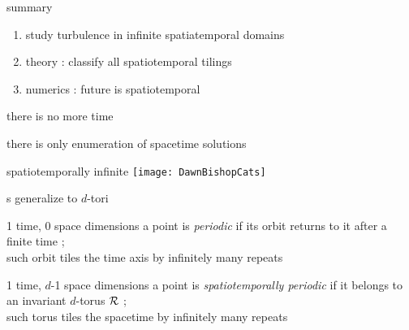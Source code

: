 \begin{frame}{summary}
\begin{enumerate}
              \item
study turbulence in infinite spatiatemporal domains
              \item
theory : classify all spatiotemporal tilings
              \item
numerics : future is spatiotemporal
\end{enumerate}

\vfill

there is no more time

\medskip

there is only enumeration of spacetime solutions
\end{frame}

\begin{frame}{spatiotemporally infinite \catlatt}
\hfill\texttt{[image: DawnBishopCats]}
\end{frame}

\begin{frame}{\po s generalize to $d$-tori}

\begin{block}{1 time, 0 space dimensions}
a {\statesp} point is {\em periodic} if its orbit returns to it
after a finite time \period{} ;
\\
such orbit tiles the time axis
by infinitely many repeats
\end{block}

\bigskip

\begin{block}{1 time, $d$-1 space dimensions}
 a {\statesp} point is {\em spatiotemporally periodic} if
it belongs to \\ an invariant $d$-torus ${\mathcal{R}}$ ;
\\
such torus tiles the spacetime
by infinitely many repeats
\end{block}
\end{frame}





